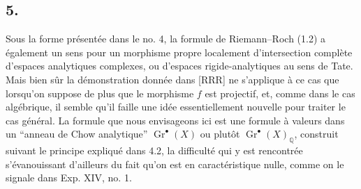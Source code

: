 \documentclass[11pt]{article}
\newcommand{\Gr}{\operatorname{Gr}}
\providecommand{\Gr}{\operatorname{Gr}}
\providecommand{\Gr}{\operatorname{G}}
\begin{document}
\subsection*{5.}
Sous la forme pr\'esent\'ee dans le no. 4, la formule de Riemann--Roch (1.2) a \'egalement un sens pour un morphisme propre localement d'intersection compl\`ete d'espaces analytiques complexes, ou d'espaces rigide-analytiques au sens de Tate. Mais bien s\^ur la d\'emonstration donn\'ee dans [RRR] ne s'applique \`a ce cas que lorsqu'on suppose de plus que le morphisme $f$ est projectif, et, comme dans le cas alg\'ebrique, il semble qu'il faille une id\'ee essentiellement nouvelle pour traiter le cas g\'en\'eral. La formule que nous envisageons ici est une formule \`a valeurs dans un ``anneau de Chow analytique'' $\Gr^\bullet(X)$ ou plut\^ot $\Gr^\bullet(X)_{\mathbb Q}$, construit suivant le principe expliqu\'e dans 4.2, la difficult\'e qui y est rencontr\'ee s'\'evanouissant d'ailleurs du fait qu'on est en caract\'eristique nulle, comme on le signale dans Exp. XIV, no. 1.
\end{document}
